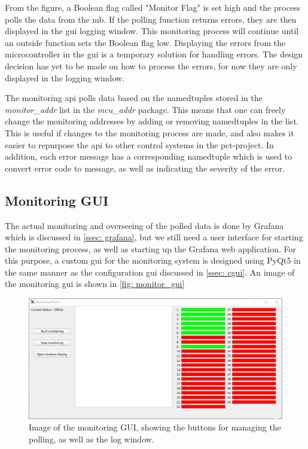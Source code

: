 \documentclass[main.tex]{subfiles}
\begin{document}
From the figure, a Boolean flag called "Monitor Flag" is set high and the process polls the data from the \gls{mb}. If the polling function returns errors, they are then displayed in the \gls{gui} logging window. This monitoring process will continue until an outside function sets the Boolean flag low. Displaying the errors from the microcontroller in the \gls{gui} is a temporary solution for handling errors. The design decision has yet to be made on how to process the errors, for now they are only displayed in the logging window.


The monitoring \gls{api} polls data based on the namedtuples stored in the \textit{monitor\_addr} list in the \textit{mcu\_addr} package. This means that one can freely change the monitoring addresses by adding or removing namedtuples in the list. This is useful if changes to the monitoring process are made, and also makes it easier to repurpose the \gls{api} to other control systems in the \gls{pct}-project. In addition, each error message has a corresponding namedtuple which is used to convert error code to message, as well as indicating the severity of the error.


\subsection{Monitoring GUI}

The actual monitoring and overseeing of the polled data is done by Grafana which is discussed in \autoref{ssec: grafana}, but we still need a user interface for starting the monitoring process, as well as starting up the Grafana web application. For this purpose, a custom \gls{gui} for the monitoring system is designed using PyQt5 in the same manner as the configuration \gls{gui} discussed in \autoref{ssec: cgui}. An image of the monitoring \gls{gui} is shown in \autoref{fig: monitor_gui}

\begin{figure}[!ht]
    \centering
    \includegraphics[scale=0.5]{images/monitoring_gui.png}
    \caption{Image of the monitoring GUI, showing the buttons for managing the polling, as well as the log window.}
    \label{fig: monitor_gui}
\end{figure}
\FloatBarrier
\end{document}
